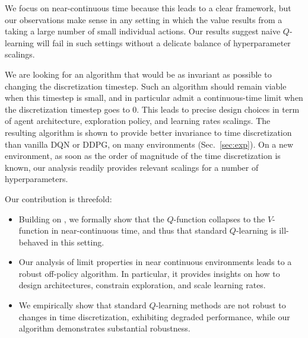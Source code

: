 We focus on near-continuous time because this leads to a clear framework,
but our observations make sense in any setting in which the value
results from a taking a large number of small individual actions. Our
results suggest naive $Q$-learning will fail in such settings without a
delicate balance of hyperparameter scalings.

We are looking for an algorithm that would be as invariant as possible to
changing the discretization timestep. Such an 
algorithm should remain viable when this timestep is small, and in particular admit a
continuous-time
limit when the discretization timestep goes to $0$.  This
leads to precise design choices in term of agent architecture, exploration
policy, and learning rates scalings.  The resulting algorithm is shown to
provide better invariance to time discretization than
vanilla DQN or DDPG, on many environments (Sec.~\ref{sec:exp}).  On a new environment, as soon as the
order of magnitude of the time discretization is known, our analysis readily
provides relevant scalings for a number of hyperparameters.


Our contribution is threefold:
\begin{itemize} 
\item Building on \cite{adv_upd}, we formally show that the $Q$-function collapses to the $V$-function in near-continuous time, and thus that
    standard $Q$-learning is ill-behaved in this setting.
  \item Our analysis of limit properties in near continuous environments leads to a robust off-policy algorithm. In particular,
    it provides insights on how to design architectures, constrain exploration, and scale learning rates.
  \item We empirically show that standard $Q$-learning methods are not
  robust to changes in time discretization, exhibiting degraded
  performance, while our algorithm demonstrates
  substantial robustness.
\end{itemize}


